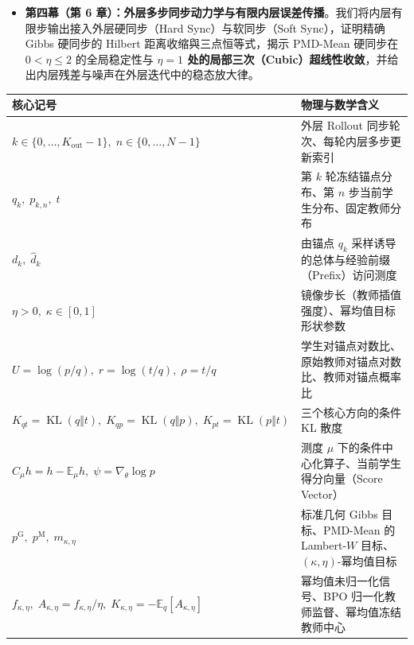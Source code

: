 \documentclass[lang=cn,scheme=chinese,openany]{../book/elegantbook}
\newcommand{\E}{\mathbb E}
\newcommand{\KL}{\operatorname{KL}}
\begin{document}
\begin{itemize}
\begin{enumerate}
  \item \textbf{PMD-Part} 在锚点测度 $q_k$ 下直接回归完整对数比率（无需重要性比率），但依赖难以计算的配分函数 $\log Z$，且当目标步幅 $\Delta>1$ 时在锚点处出现\textbf{严格负曲率（非凸）}；
  \item \textbf{PMD-Mean} 用奖励均值近似 $\log Z$，其精确总体解是偏离 Gibbs 目标的 \textbf{Lambert-$W$ 投影}（等价于额外施加 $\frac12\KL(q_k\Vert p)^2$ 惩罚）；
  \item \textbf{BPO（Bregman Policy Optimization）} 在锚点测度 $q_k$ 下对学生对数比率与教师信号同时中心化：\textbf{完全消去配分函数 $\log Z$}，\textbf{无需重要性比率 $p/q$}，在独立 Logits 下是具有\textbf{常曲率 $F_q/\eta\succeq 0$ 的全局凸二次目标}，其残差采样噪声随内层拟合收敛自动归零，且沿锚点 Fisher 预条件路径\textbf{在每一个有限内层步都单调降低到教师的全部凸 $f$-散度}！
  \end{enumerate}
\item \textbf{第四幕（第 6 章）：外层多步同步动力学与有限内层误差传播}。我们将内层有限步输出接入外层硬同步（Hard Sync）与软同步（Soft Sync），证明精确 Gibbs 硬同步的 Hilbert 距离收缩與三点恒等式，揭示 PMD-Mean 硬同步在 $0<\eta\le 2$ 的全局稳定性与 \textbf{$\eta=1$ 处的局部三次（Cubic）超线性收敛}，并给出内层残差与噪声在外层迭代中的稳态放大律。
\end{itemize}

\begin{center}
\begin{tabularx}{\textwidth}{@{}lX@{}}
\toprule
核心记号 & 物理与数学含义\\
\midrule
$k\in\{0,\ldots,K_{\mathrm{out}}-1\},\; n\in\{0,\ldots,N-1\}$ & 外层 Rollout 同步轮次、每轮内层多步更新索引\\
$q_k,\; p_{k,n},\; t$ & 第 $k$ 轮冻结锚点分布、第 $n$ 步当前学生分布、固定教师分布\\
$d_k,\; \widehat d_k$ & 由锚点 $q_k$ 采样诱导的总体与经验前缀（Prefix）访问测度\\
$\eta>0,\; \kappa\in[0,1]$ & 镜像步长（教师插值强度）、幂均值目标形状参数\\
$U=\log(p/q),\; r=\log(t/q),\; \rho=t/q$ & 学生对锚点对数比、原始教师对锚点对数比、教师对锚点概率比\\
$K_{qt}=\KL(q\Vert t),\; K_{qp}=\KL(q\Vert p),\; K_{pt}=\KL(p\Vert t)$ & 三个核心方向的条件 KL 散度\\
$C_\mu h=h-\E_\mu h,\; \psi=\nabla_\theta\log p$ & 测度 $\mu$ 下的条件中心化算子、当前学生得分向量（Score Vector）\\
$p^{\mathrm G},\; p^{\mathrm M},\; m_{\kappa,\eta}$ & 标准几何 Gibbs 目标、PMD-Mean 的 Lambert-$W$ 目标、$(\kappa,\eta)$-幂均值目标\\
$f_{\kappa,\eta},\; A_{\kappa,\eta}=f_{\kappa,\eta}/\eta,\; K_{\kappa,\eta}=-\E_q[A_{\kappa,\eta}]$ & 幂均值未归一化信号、BPO 归一化教师监督、幂均值冻结教师中心\\
\bottomrule
\end{tabularx}
\end{center}
\end{document}
